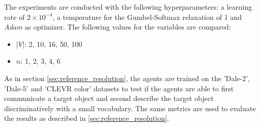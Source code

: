 The experiments are conducted with the following hyperparameters: a learning rate of $2\times10^{-4}$, a temperature for the Gumbel-Softmax relaxation of 1 and \emph{Adam} \citep{Kingma2015} as optimizer.
The following values for the variables are compared:
\begin{itemize}
    \item $|V|$: 2, 10, 16, 50, 100
    \item $n$: 1, 2, 3, 4,  6
\end{itemize}

As in section \ref{sec:reference_resolution}, the agents are trained on the 'Dale-2', 'Dale-5' and 'CLEVR color' datasets to test if the agents are able to first communicate a target object and second describe the target object discriminatively with a small vocabulary.
The same metrics are used to evaluate the results as described in \ref{sec:reference_resolution}.

